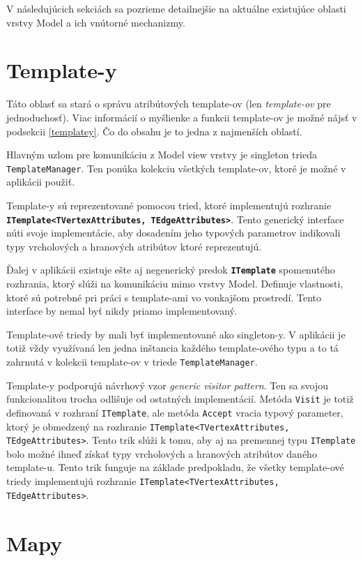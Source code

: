 V následujúcich sekciách sa pozrieme detailnejšie na aktuálne existujúce oblasti vrstvy Model a ich vnútorné mechanizmy.

\section{Template-y}

Táto oblasť sa stará o správu atribútových template-ov (len \textit{template-ov} pre jednoduchosť). Viac informácií o myšlienke a funkcii template-ov je možné nájsť v podsekcii \ref{templatey}. Čo do obsahu je to jedna z najmenších oblastí. 

Hlavným uzlom pre komunikáciu z Model view vrstvy je singleton trieda \texttt{TemplateManager}. Ten ponúka kolekciu všetkých template-ov, ktoré je možné v aplikácii použiť.

\bigskip

Template-y sú reprezentované pomocou tried, ktoré implementujú rozhranie \textbf{\texttt{ITemplate<TVertexAttributes, TEdgeAttributes>}}. Tento generický interface núti svoje implementácie, aby dosadením jeho typových parametrov indikovali typy vrcholových a hranových atribútov ktoré reprezentujú. 

Ďalej v aplikácii existuje ešte aj negenerický predok \textbf{\texttt{ITemplate}} spomenutého rozhrania, ktorý slúži na komunikáciu mimo vrstvy Model. Definuje vlastnosti, ktoré sú potrebné pri práci s template-ami vo vonkajšom prostredí. Tento interface by nemal byť nikdy priamo implementovaný.

Template-ové triedy by mali byť implementované ako singleton-y. V aplikácii je totiž vždy využívaná len jedna inštancia každého template-ového typu a to tá zahrnutá v kolekcii template-ov v triede \texttt{TemplateManager}.

Template-y podporujú návrhový vzor \textit{generic visitor pattern}. Ten sa svojou funkcionalitou trocha odlišuje od ostatných implementácií. Metóda \texttt{Visit} je totiž definovaná v rozhraní \texttt{ITemplate}, ale metóda \texttt{Accept} vracia typový parameter, ktorý je obmedzený na rozhranie \texttt{ITemplate<TVertexAttributes, TEdgeAttributes>}. Tento trik slúži k tomu, aby aj na premennej typu \texttt{ITemplate} bolo možné ihneď získať typy vrcholových a hranových atribútov daného template-u. Tento trik funguje na základe predpokladu, že všetky template-ové triedy implementujú rozhranie \texttt{ITemplate<TVertexAttributes, TEdgeAttributes>}. 

\section{Mapy}

